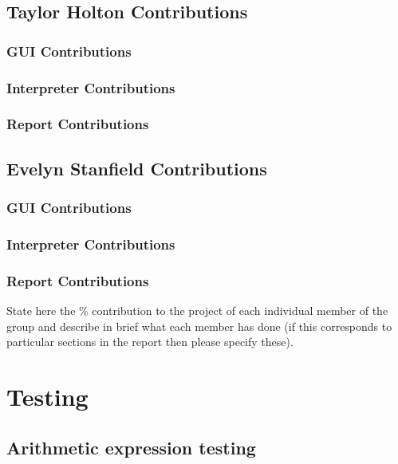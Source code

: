 \documentclass[a4paper, oneside, 11pt]{report}
\begin{document}
\section{Taylor Holton Contributions}
\subsection{GUI Contributions}
\subsection{Interpreter Contributions}
\subsection{Report Contributions}

\section{Evelyn Stanfield Contributions}
\subsection{GUI Contributions}
\subsection{Interpreter Contributions}
\subsection{Report Contributions}

State here the \% contribution to the project of each individual member of the group and describe in brief what each member has done (if this corresponds to particular sections in the report then please specify these).

\chapter{Testing}
\label{app:test}
\section{Arithmetic expression testing} \label{ArithTest}
\end{document}
